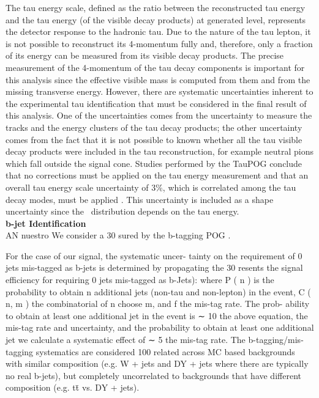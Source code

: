 \noindent The tau energy scale, defined as the ratio between the reconstructed tau energy
and the tau energy (of the visible decay products) at generated level, represents the 
detector response to the hadronic tau. Due to 
the nature of the tau lepton, it is not possible to reconstruct its 
4-momentum fully and, therefore, only a fraction of its energy can be measured 
from its visible decay products. The precise measurement of the 4-momentum of the tau decay 
components is important for this analysis since the effective visible mass is computed from them
and from the missing transverse energy. However, there are systematic uncertainties
inherent to the experimental tau identification that must be considered 
in the final result of this analysis. One of the uncertainties comes from 
the uncertainty to measure the tracks and the energy clusters of 
the tau decay products; the other uncertainty comes from the fact that it 
is not possible to known whether all the tau visible decay products
were included in the tau reconstruction, for example neutral pions which fall 
outside the signal cone. Studies performed by the TauPOG conclude that 
no corrections must be applied on the tau energy measurement and that 
an overall tau energy scale uncertainty of 3$\%$, which is correlated among the 
tau decay modes, must be applied \cite{TauPOG}. This uncertainty is included 
as a shape uncertainty since the \mass~distribution depends on the tau energy.\\

\textbf{b-jet Identification}\\


AN nuestro
We consider a 30%
sured by the b-tagging POG \cite{bjetID}. 


For the case of our signal, the systematic uncer-
tainty on the requirement of 0 jets mis-tagged as b-jets is determined by propagating
the 30%
resents the signal efficiency for requiring 0 jets mis-tagged as b-Jets):
where P ( n ) is the probability to obtain n additional jets (non-tau and non-lepton) in
the event, C ( n, m ) the combinatorial of n choose m, and f the mis-tag rate. The prob-
ability to obtain at least one additional jet in the event is ∼ 10%
the above equation, the mis-tag rate and uncertainty, and the probability to obtain at
least one additional jet we calculate a systematic effect of ∼ 5%
the mis-tag rate. The b-tagging/mis-tagging systematics are considered 100%
related across MC based backgrounds with similar composition (e.g. W + jets and
DY + jets where there are typically no real b-jets), but completely uncorrelated to
backgrounds that have different composition (e.g. tt̄ vs. DY + jets).

